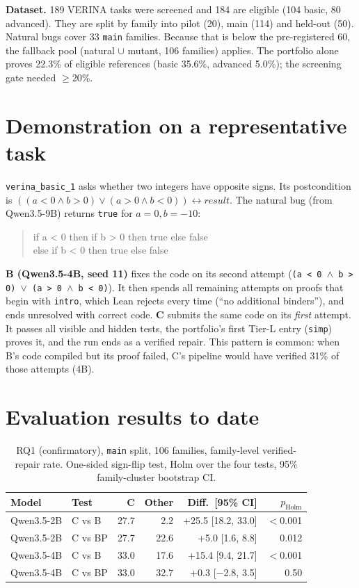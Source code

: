 \documentclass[10pt,twocolumn]{article}
\begin{document}


\textbf{Dataset.} 189 VERINA tasks were screened and 184 are eligible (104 basic, 80 advanced). They are split by
family into pilot (20), main (114) and held-out (50). Natural bugs cover 33 \texttt{main} families. Because that
is below the pre-registered 60, the fallback pool (natural $\cup$ mutant, 106 families) applies. The portfolio alone
proves 22.3\% of eligible references (basic 35.6\%, advanced 5.0\%); the screening gate needed $\geq$20\%.

\section{Demonstration on a representative task}
\texttt{verina\_basic\_1} asks whether two integers have opposite signs. Its postcondition is
$((a<0\wedge b>0)\vee(a>0\wedge b<0)) \leftrightarrow \mathit{result}$. The natural bug (from Qwen3.5-9B) returns
\texttt{true} for $a=0,b=-10$:
\begin{quote}\small\ttfamily if a < 0 then if b > 0 then true else false\\ else if b < 0 then true else false\end{quote}
\textbf{B (Qwen3.5-4B, seed 11)} fixes the code on its second attempt
(\texttt{(a < 0 $\wedge$ b > 0) $\vee$ (a > 0 $\wedge$ b < 0)}). It then spends all remaining attempts on
proofs that begin with \texttt{intro}, which Lean rejects every time (``no additional binders''), and ends
unresolved with correct code. \textbf{C} submits the same code on its \emph{first} attempt. It passes all visible
and hidden tests, the portfolio's first Tier-L entry (\texttt{simp}) proves it, and the run ends as a verified
repair. This pattern is common: when B's code compiled but its proof failed, C's pipeline would have verified
31\% of those attempts (4B).

\section{Evaluation results to date}
\begin{table}[!h]\centering\small
\caption{RQ1 (confirmatory), \texttt{main} split, 106 families, family-level verified-repair rate. One-sided
sign-flip test, Holm over the four tests, 95\% family-cluster bootstrap CI.}\label{tab:rq1}
\setlength{\tabcolsep}{3pt}
\begin{tabular}{@{}llrrrr@{}}\toprule
Model & Test & C & Other & Diff.\ [95\% CI] & $p_\text{Holm}$ \\\midrule
Qwen3.5-2B & C vs B  & 27.7 & 2.2  & +25.5 [18.2, 33.0] & $<$0.001 \\
Qwen3.5-2B & C vs BP & 27.7 & 22.6 & +5.0 [1.6, 8.8]   & 0.012 \\
Qwen3.5-4B & C vs B  & 33.0 & 17.6 & +15.4 [9.4, 21.7] & $<$0.001 \\
Qwen3.5-4B & C vs BP & 33.0 & 32.7 & +0.3 [$-$2.8, 3.5] & 0.50 \\\bottomrule
\end{tabular}
\end{table}
\end{document}

